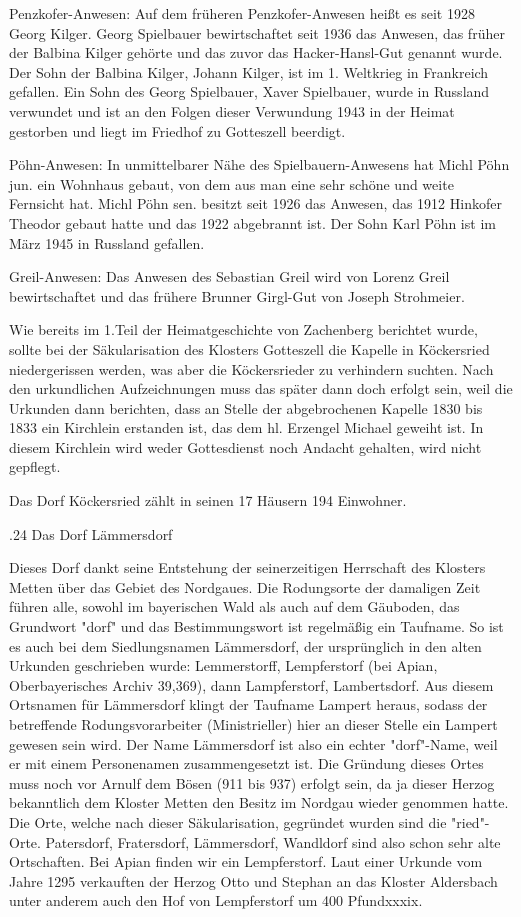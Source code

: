 Penzkofer-Anwesen: Auf dem früheren Penzkofer-Anwesen heißt es seit 1928 Georg
Kilger. Georg Spielbauer bewirtschaftet seit 1936 das Anwesen, das früher der
Balbina Kilger gehörte und das zuvor das Hacker-Hansl-Gut genannt wurde. Der
Sohn der Balbina Kilger, Johann Kilger, ist im 1. Weltkrieg in Frankreich
gefallen. Ein Sohn des Georg Spielbauer, Xaver Spielbauer, wurde in Russland
verwundet und ist an den Folgen dieser Verwundung 1943 in der Heimat gestorben
und liegt im Friedhof zu Gotteszell beerdigt.

Pöhn-Anwesen: In unmittelbarer Nähe des Spielbauern-Anwesens hat Michl Pöhn jun.
ein Wohnhaus gebaut, von dem aus man eine sehr schöne und weite Fernsicht hat.
Michl Pöhn sen. besitzt seit 1926 das Anwesen, das 1912 Hinkofer Theodor gebaut
hatte und das 1922 abgebrannt ist. Der Sohn Karl Pöhn ist im März 1945 in
Russland gefallen.

Greil-Anwesen: Das Anwesen des Sebastian Greil wird von Lorenz Greil
bewirtschaftet und das frühere Brunner Girgl-Gut von Joseph Strohmeier.

Wie bereits im 1.Teil der Heimatgeschichte von Zachenberg berichtet wurde,
sollte bei der Säkularisation des Klosters Gotteszell die Kapelle in Köckersried
niedergerissen werden, was aber die Köckersrieder zu verhindern suchten. Nach
den urkundlichen Aufzeichnungen muss das später dann doch erfolgt sein, weil die
Urkunden dann berichten, dass an Stelle der abgebrochenen Kapelle 1830 bis 1833
ein Kirchlein erstanden ist, das dem hl. Erzengel Michael geweiht ist. In diesem
Kirchlein wird weder Gottesdienst noch Andacht gehalten, wird nicht gepflegt.

Das Dorf Köckersried zählt in seinen 17 Häusern 194 Einwohner.

.24 Das Dorf Lämmersdorf

Dieses Dorf dankt seine Entstehung der seinerzeitigen Herrschaft des Klosters
Metten über das Gebiet des Nordgaues. Die Rodungsorte der damaligen Zeit führen
alle, sowohl im bayerischen Wald als auch auf dem Gäuboden, das Grundwort "dorf"
und das Bestimmungswort ist regelmäßig ein Taufname. So ist es auch bei dem
Siedlungsnamen Lämmersdorf, der ursprünglich in den alten Urkunden geschrieben
wurde: Lemmerstorff, Lempferstorf (bei Apian, Oberbayerisches Archiv 39,369),
dann Lampferstorf, Lambertsdorf. Aus diesem Ortsnamen für Lämmersdorf klingt der
Taufname Lampert heraus, sodass der betreffende Rodungsvorarbeiter
(Ministrieller) hier an dieser Stelle ein Lampert gewesen sein wird. Der Name
Lämmersdorf ist also ein echter "dorf"-Name, weil er mit einem Personenamen
zusammengesetzt ist. Die Gründung dieses Ortes muss noch vor Arnulf dem Bösen
(911 bis 937) erfolgt sein, da ja dieser Herzog bekanntlich dem Kloster Metten
den Besitz im Nordgau wieder genommen hatte. Die Orte, welche nach dieser
Säkularisation, gegründet wurden sind die "ried"-Orte. Patersdorf, Fratersdorf,
Lämmersdorf, Wandldorf sind also schon sehr alte Ortschaften. Bei Apian finden
wir ein Lempferstorf. Laut einer Urkunde vom Jahre 1295 verkauften der Herzog
Otto und Stephan an das Kloster Aldersbach unter anderem auch den Hof von
Lempferstorf um 400 Pfundxxxix.

